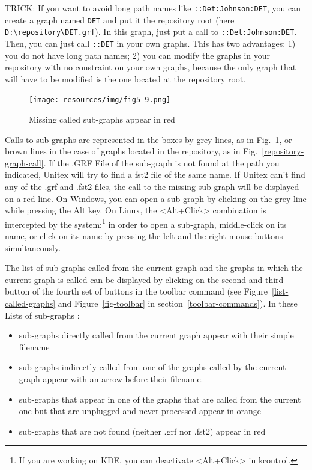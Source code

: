 
\noindent TRICK: If you want to avoid long path names like
\verb+::Det:Johnson:DET+, you can create a graph named \verb+DET+ and put it the
repository root (here \verb+D:\repository\DET.grf+). In this graph, just put a
call to \verb+::Det:Johnson:DET+. Then, you can just call \verb+::DET+ in your
own graphs. This has two advantages: 1) you do not have long path names; 2) you
can modify the graphs in your repository with no constraint on your own graphs,
because the only graph that will have to be modified is the one located at the
repository root.

\begin{figure}[!ht]
\begin{center}
\texttt{[image: resources/img/fig5-9.png]}
\caption{Missing called sub-graphs appear in red\label{call-colours}}
\end{center}
\end{figure}


\bigskip
\noindent Calls to sub-graphs are represented in the boxes by grey lines, as in Fig.~\ref{call-colours}, or brown
lines in the case of graphs located in the repository, as in Fig.~\ref{repository-graph-call}. If the .GRF File of the sub-graph is not found at the path you indicated, Unitex will try to find a fst2 file of the same name. If Unitex can't find any of the .grf and .fst2 files, the call to the missing sub-graph will be displayed on a red line. 
On Windows, you can open a sub-graph by clicking on the grey line while pressing the Alt key.
On Linux, the <Alt+Click>  combination is intercepted by the system:\footnote{If you are 
working on KDE, you can deactivate <Alt+Click> in kcontrol.} in order to open a
sub-graph, middle-click on its name, or click on its name by pressing the left and the right mouse buttons
simultaneously.

\bigskip
\noindent The list of sub-graphs called from the current graph and the graphs in which the current graph is called can be displayed by clicking on the second and third button of the fourth set of buttons in the toolbar command (see Figure~\ref{list-called-graphs} and
Figure~\ref{fig-toolbar} in section~\ref{toolbar-commands}).
In these Lists of sub-graphs : 
\begin{itemize}
\item sub-graphs directly called from the current graph appear with their simple filename
\item sub-graphs indirectly called from one of the graphs called by the current graph appear with an arrow before their filename.
\item sub-graphs that appear in one of the graphs that are called from the current one but that are unplugged and never processed appear in orange
\item sub-graphs that are not found (neither .grf nor .fst2) appear in red
\end{itemize}

